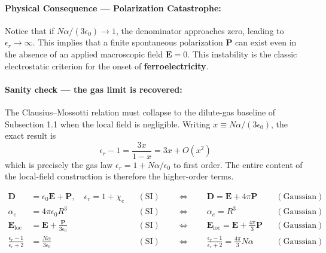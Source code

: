\documentclass[11pt,a4paper]{article}
\begin{document}
\paragraph{Physical Consequence --- Polarization Catastrophe:}
Notice that if $N\alpha / (3\epsilon_0) \to 1$, the denominator approaches zero, leading to $\epsilon_r \to \infty$. This implies that a finite spontaneous polarization $\mathbf{P}$ can exist even in the absence of an applied macroscopic field $\mathbf{E} = 0$. This instability is the classic electrostatic criterion for the onset of \textbf{ferroelectricity}.

\paragraph{Sanity check --- the gas limit is recovered:}
The Clausius--Mossotti relation must collapse to the dilute-gas baseline of Subsection 1.1 when the local field is negligible. Writing $x \equiv N\alpha/(3\epsilon_0)$, the exact result is
\begin{equation}
    \epsilon_r - 1 = \frac{3x}{1-x} = 3x + O(x^2)
\end{equation}
which is precisely the gas law $\epsilon_r = 1 + N\alpha/\epsilon_0$ to first order. The entire content of the local-field construction is therefore the higher-order terms.

\begin{tcolorbox}[colback=green!8!white,colframe=green!45!black,title=Unit conventions (SI and Gaussian)]
\begin{align}
    \mathbf{D} &= \epsilon_0\mathbf{E} + \mathbf{P}, \quad \epsilon_r = 1+\chi_e
    && (\mathrm{SI}) \qquad \Longleftrightarrow \qquad \mathbf{D} = \mathbf{E} + 4\pi\mathbf{P}
    && (\mathrm{Gaussian}) \\
    \alpha_e &= 4\pi\epsilon_0 R^3
    && (\mathrm{SI}) \qquad \Longleftrightarrow \qquad \alpha_e = R^3
    && (\mathrm{Gaussian}) \\
    \mathbf{E}_{\text{loc}} &= \mathbf{E} + \frac{\mathbf{P}}{3\epsilon_0}
    && (\mathrm{SI}) \qquad \Longleftrightarrow \qquad \mathbf{E}_{\text{loc}} = \mathbf{E} + \frac{4\pi}{3}\mathbf{P}
    && (\mathrm{Gaussian}) \\
    \frac{\epsilon_r-1}{\epsilon_r+2} &= \frac{N\alpha}{3\epsilon_0}
    && (\mathrm{SI}) \qquad \Longleftrightarrow \qquad \frac{\epsilon_r-1}{\epsilon_r+2} = \frac{4\pi}{3}N\alpha
    && (\mathrm{Gaussian})
\end{align}
\end{tcolorbox}
\end{document}
